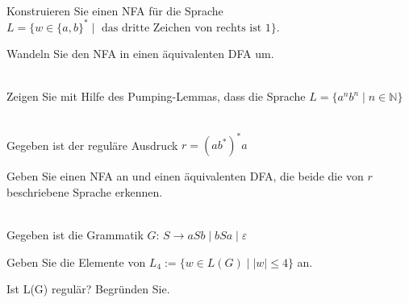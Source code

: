 \\
Konstruieren Sie einen NFA für die Sprache
$L = \{ w \in \{a,b\}^* \mid \text{ das dritte Zeichen von rechts ist } 1 \}$.

Wandeln Sie den NFA in einen äquivalenten DFA um.


\\
Zeigen Sie mit Hilfe des Pumping-Lemmas, dass die Sprache
$L = \{ a^n b^n \mid n\in\mathbb{N}\}$

\\
Gegeben ist der reguläre Ausdruck
$r = (ab^*)^*a$

Geben Sie einen NFA an und einen äquivalenten DFA, die beide die von $r$ beschriebene Sprache erkennen.

\\
Gegeben ist die Grammatik $G$:
$S\rightarrow aSb \mid bSa \mid \varepsilon$

Geben Sie die Elemente von $L_4:=\{w\in L(G)\mid |w|\leq 4\}$ an.

Ist L(G) regulär? Begründen Sie.



